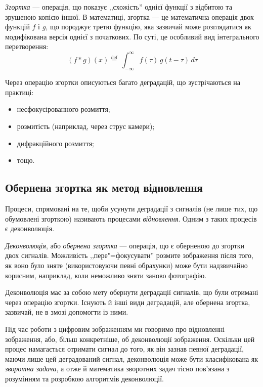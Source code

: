 \documentclass[simple,14pt,utf8,ukrainian]{eskdtext}
\begin{document}
    \emph{Згортка} --- операція, що показує ,,схожість'' однієї функції з
    відбитою та зрушеною копією іншої.
    В математиці, згортка --- це математична операція двох функцій $f$ і $g$, що
    породжує третю функцію, яка зазвичай може розглядатися як модифікована
    версія однієї з початкових.
    По суті, це особливий вид інтегрального перетворення:
    \[
      \left( f * g \right)\left( x \right) \stackrel{\mathrm{def}}{=}\
      \int_{-\infty}^\infty f(\tau)\, g(t - \tau)\, d\tau
    \]

    Через операцію згортки описуються багато деградацій, що зустрічаються на
    практиці:
    \begin{itemize}
      \item несфокусірованного розмиття;
      \item розмитість (наприклад, через струс камери);
      \item дифракційного розмиття;
      \item тощо.
    \end{itemize}
    \clearpage

  \subsection{Обернена згортка як метод відновлення}

    Процеси, спрямовані на те, щоби усунути деградації з сигналів (не лише тих,
    що обумовлені згорткою) називають процесами \emph{відновлення}.
    Одним з таких процесів є деконволюція.

    \emph{Деконволюція}, або \emph{обернена згортка} --- операція, що є
    оберненою до згортки двох сигналів.
    Можливість ,,пере"=фокусувати'' розмите зображення після того, як воно було
    зняте (використовуючи певні обрахунки) може бути надзвичайно корисним,
    наприклад, коли неможливо зняти заново фотографію.

    Деконволюція має за собою мету обернути деградації сигналів, що були
    отримані через операцію згортки.
    Існують й інші види деградацій, але обернена згортка, зазвичай, не в змозі
    допомогти із ними.

    Під час роботи з цифровим зображенням ми говоримо про відновленні зображення,
    або, більш конкретніше, об деконволюції зображення.
    Оскільки цей процес намагається отримати сигнал до того, як він зазнав
    певної деградації, маючи лише цей деградований сигнал, деконволюція може
    бути класифікована як \emph{зворотна задача}, а отже й математика зворотних
    задач тісно пов’язана з розумінням та розробкою алгоритмів деконволюції.
\end{document}
